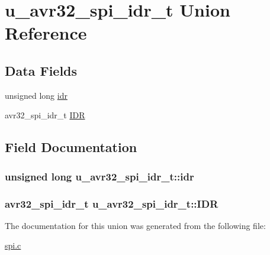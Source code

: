 \hypertarget{unionu__avr32__spi__idr__t}{
\section{u\-\_\-avr32\-\_\-spi\-\_\-idr\-\_\-t \-Union \-Reference}
\label{unionu__avr32__spi__idr__t}
}
\subsection*{\-Data \-Fields}
\begin{DoxyCompactItemize}
\item 
unsigned long \hyperlink{unionu__avr32__spi__idr__t_a2d18e7136f65428cfb8b3f137371a799}{idr}
\item 
avr32\-\_\-spi\-\_\-idr\-\_\-t \hyperlink{unionu__avr32__spi__idr__t_a06ada7c165b785398d24060fc7585668}{\-I\-D\-R}
\end{DoxyCompactItemize}


\subsection{\-Field \-Documentation}
\hypertarget{unionu__avr32__spi__idr__t_a2d18e7136f65428cfb8b3f137371a799}{
\subsubsection[{idr}]{\setlength{\rightskip}{0pt plus 5cm}unsigned long {\bf u\-\_\-avr32\-\_\-spi\-\_\-idr\-\_\-t\-::idr}}}
\label{unionu__avr32__spi__idr__t_a2d18e7136f65428cfb8b3f137371a799}
\hypertarget{unionu__avr32__spi__idr__t_a06ada7c165b785398d24060fc7585668}{
\subsubsection[{\-I\-D\-R}]{\setlength{\rightskip}{0pt plus 5cm}avr32\-\_\-spi\-\_\-idr\-\_\-t {\bf u\-\_\-avr32\-\_\-spi\-\_\-idr\-\_\-t\-::\-I\-D\-R}}}
\label{unionu__avr32__spi__idr__t_a06ada7c165b785398d24060fc7585668}


\-The documentation for this union was generated from the following file\-:\begin{DoxyCompactItemize}
\item 
\hyperlink{spi_8c}{spi.\-c}\end{DoxyCompactItemize}
